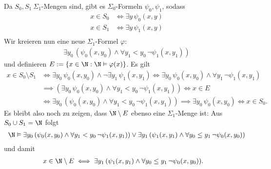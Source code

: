 \begin{solution}
Da $S_0,S_1 \ \Sigma_1$-Mengen sind, gibt es $\Sigma_0$-Formeln $\psi_0,\psi_1$, sodass
\begin{align*}
	x \in S_0 &\iff \exists y\, \psi_0(x,y) \\
	x \in S_1 &\iff \exists y\, \psi_1(x,y) \\
\end{align*}
Wir kreieren nun eine neue $\Sigma_1$-Formel $\varphi$:
\begin{align*}
	\exists y_0\, (\psi_0(x,y_0) \land \forall y_1 < y_0\, \neg \psi_1(x,y_1))
\end{align*}
und definieren $E := \{x \in \N: \N \vDash \varphi(x)\}$.
Es gilt
\begin{align*}
	x \in S_0 \setminus S_1 &\iff \exists y_0\, \psi_0(x,y_0) \land
	\neg \exists y_1\, \psi_1(x,y_1) \iff
	\exists y_0\, \psi_0(x,y_0) \land
	 \forall y_1\, \neg \psi_1(x,y_1) \\
	 &\implies (\exists y_0\, \psi_0(x,y_0) \land
 	 \forall y_1 < y_0\, \neg \psi_1(x,y_1)) \iff x \in E \\
	 &\iff \exists y_0\, (\psi_0(x,y_0) \land \forall y_1 < y_0\, \neg \psi_1(x,y_1))
	 \implies \exists y_0\, \psi_0(x,y_0) \iff x \in S_0.
\end{align*}
Es bleibt also noch zu zeigen, dass $\N \setminus E$ ebenso eine $\Sigma_1$-Menge ist:
Aus $S_0 \cup S_1 = \N$ folgt
\begin{align*}
	\N \vDash \exists y_0\, (\psi_0(x,y_0) \land \forall y_1 < y_0\, \neg \psi_1(x,y_1))
	\lor \exists y_1\, (\psi_1(x,y_1) \land \forall y_0 \leq y_1\, \neg \psi_0(x,y_0))
\end{align*}
und damit
\begin{align*}
	x \in \N \setminus E &\iff \exists y_1\, (\psi_1(x,y_1) \land \forall y_0 \leq y_1\, \neg \psi_0(x,y_0)).
\end{align*}
\end{solution}
